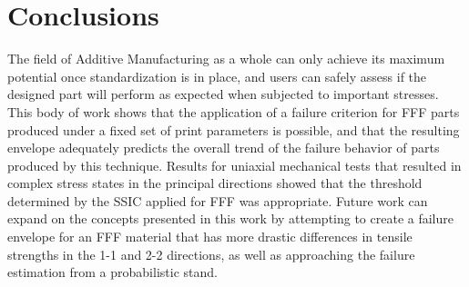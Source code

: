 \documentclass[main.tex]{subfiles}
\begin{document}
\section{Conclusions}\label{sec:concl_ssic}

The field of Additive Manufacturing as a whole can only achieve its maximum potential once standardization is in place, and users can safely assess if the designed part will perform as expected when subjected to important stresses. This body of work shows that the application of a failure criterion for FFF parts produced under a fixed set of print parameters is possible, and that the resulting envelope adequately predicts the overall trend of the failure behavior of parts produced by this technique. Results for uniaxial mechanical tests that resulted in complex stress states in the principal directions showed that the threshold determined by the SSIC applied for FFF was appropriate. Future work can expand on the concepts presented in this work by attempting to create a failure envelope for an FFF material that has more drastic differences in tensile strengths in the 1-1 and 2-2 directions, as well as approaching the failure estimation from a probabilistic stand.
\end{document}
